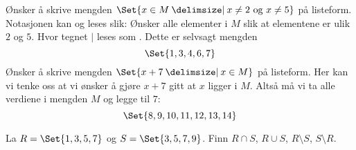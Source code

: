 \documentclass[a4paper,11pt]{article}
\begin{document}
\begin{solution}
   Ønsker å skrive mengden
  $\Set{x \in M \given x \neq 2 \ \text{og} \ x \neq 5}$ på listeform.
  Notasjonen kan og leses slik: Ønsker alle elementer i $M$ slik at elementene
  er ulik $2$ og $5$. Hvor tegnet $\mid$ leses som .  Dette er
  selvsagt mengden
  \begin{equation*}
    \Set{1, 3, 4, 6, 7}
  \end{equation*}
   Ønsker å skrive mengden
  $\Set{x + 7 \given x \in M}$ på listeform. Her kan vi tenke oss at vi ønsker å
  gjøre $x + 7$ gitt at $x$ ligger i $M$.  Altså må vi ta alle verdiene i
  mengden $M$ og legge til $7$:
  \begin{equation*}
    \Set{8, 9, 10, 11, 12, 13, 14}
  \end{equation*}
\end{solution}

\newpageLF

\begin{problem}
  La $R = \Set{1, 3, 5, 7}$ og $S = \Set{3, 5, 7, 9}$.
  Finn $R \cap S$, $R \cup S$, $R \setminus S$, $S \setminus R$.
\end{problem}
\end{document}

